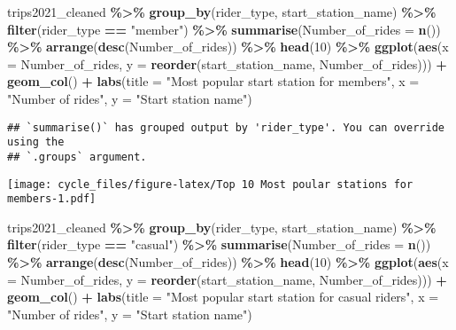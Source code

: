 \documentclass[
]{article}
\newenvironment{Shaded}{\begin{snugshade}}{\end{snugshade}}
\newcommand{\AttributeTok}[1]{\textcolor[rgb]{0.13,0.29,0.53}{#1}}
\newcommand{\DecValTok}[1]{\textcolor[rgb]{0.00,0.00,0.81}{#1}}
\newcommand{\FunctionTok}[1]{\textcolor[rgb]{0.13,0.29,0.53}{\textbf{#1}}}
\newcommand{\NormalTok}[1]{#1}
\newcommand{\SpecialCharTok}[1]{\textcolor[rgb]{0.81,0.36,0.00}{\textbf{#1}}}
\newcommand{\StringTok}[1]{\textcolor[rgb]{0.31,0.60,0.02}{#1}}
\begin{document}
\begin{Shaded}
\begin{Highlighting}[]
\NormalTok{trips2021\_cleaned }\SpecialCharTok{\%\textgreater{}\%} 
  \FunctionTok{group\_by}\NormalTok{(rider\_type, start\_station\_name) }\SpecialCharTok{\%\textgreater{}\%} 
  \FunctionTok{filter}\NormalTok{(rider\_type }\SpecialCharTok{==} \StringTok{"member"}\NormalTok{) }\SpecialCharTok{\%\textgreater{}\%} 
  \FunctionTok{summarise}\NormalTok{(}\AttributeTok{Number\_of\_rides =} \FunctionTok{n}\NormalTok{()) }\SpecialCharTok{\%\textgreater{}\%} 
  \FunctionTok{arrange}\NormalTok{(}\FunctionTok{desc}\NormalTok{(Number\_of\_rides)) }\SpecialCharTok{\%\textgreater{}\%} 
  \FunctionTok{head}\NormalTok{(}\DecValTok{10}\NormalTok{) }\SpecialCharTok{\%\textgreater{}\%} 
   \FunctionTok{ggplot}\NormalTok{(}\FunctionTok{aes}\NormalTok{(}\AttributeTok{x =}\NormalTok{ Number\_of\_rides, }\AttributeTok{y =} \FunctionTok{reorder}\NormalTok{(start\_station\_name, Number\_of\_rides))) }\SpecialCharTok{+} 
  \FunctionTok{geom\_col}\NormalTok{() }\SpecialCharTok{+}
  \FunctionTok{labs}\NormalTok{(}\AttributeTok{title =} \StringTok{"Most popular start station for members"}\NormalTok{,}
       \AttributeTok{x =} \StringTok{"Number of rides"}\NormalTok{, }\AttributeTok{y =} \StringTok{"Start station name"}\NormalTok{)}
\end{Highlighting}
\end{Shaded}

\begin{verbatim}
## `summarise()` has grouped output by 'rider_type'. You can override using the
## `.groups` argument.
\end{verbatim}

\texttt{[image: cycle\_files/figure-latex/Top 10 Most poular stations for members-1.pdf]}

\begin{Shaded}
\begin{Highlighting}[]
\NormalTok{trips2021\_cleaned }\SpecialCharTok{\%\textgreater{}\%} 
  \FunctionTok{group\_by}\NormalTok{(rider\_type, start\_station\_name) }\SpecialCharTok{\%\textgreater{}\%} 
  \FunctionTok{filter}\NormalTok{(rider\_type }\SpecialCharTok{==} \StringTok{"casual"}\NormalTok{) }\SpecialCharTok{\%\textgreater{}\%} 
  \FunctionTok{summarise}\NormalTok{(}\AttributeTok{Number\_of\_rides =} \FunctionTok{n}\NormalTok{()) }\SpecialCharTok{\%\textgreater{}\%} 
  \FunctionTok{arrange}\NormalTok{(}\FunctionTok{desc}\NormalTok{(Number\_of\_rides)) }\SpecialCharTok{\%\textgreater{}\%} 
  \FunctionTok{head}\NormalTok{(}\DecValTok{10}\NormalTok{) }\SpecialCharTok{\%\textgreater{}\%} 
  \FunctionTok{ggplot}\NormalTok{(}\FunctionTok{aes}\NormalTok{(}\AttributeTok{x =}\NormalTok{ Number\_of\_rides, }\AttributeTok{y =} \FunctionTok{reorder}\NormalTok{(start\_station\_name, Number\_of\_rides))) }\SpecialCharTok{+} 
  \FunctionTok{geom\_col}\NormalTok{() }\SpecialCharTok{+}
  \FunctionTok{labs}\NormalTok{(}\AttributeTok{title =} \StringTok{"Most popular start station for casual riders"}\NormalTok{,}
       \AttributeTok{x =} \StringTok{"Number of rides"}\NormalTok{, }\AttributeTok{y =} \StringTok{"Start station name"}\NormalTok{)}
\end{Highlighting}
\end{Shaded}
\end{document}
